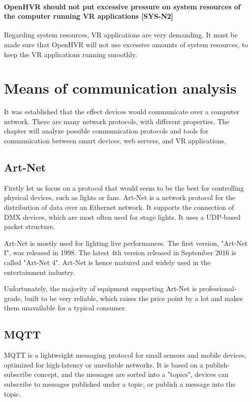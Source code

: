 \hypertarget{x-\textbf{openhvr-should-not-put-excessive-pressure-on-system-resources-of-the-computer-running-vr-applications}-[sys-n2]}{\paragraph*{\textbf{OpenHVR should not put excessive pressure on system resources of the computer running VR applications} [SYS-N2]}}
Regarding system resources, VR applications are very demanding. It must be
made sure that OpenHVR will not use excessive amounts of system resources,
to keep the VR applications running smoothly.


\hypertarget{x-means-of-communication-analysis}{\section{Means of communication analysis}}
It was established that the effect devices would communicate over a computer network.
There are many network protocols, with different properties. The chapter will
analyze possible communication protocols and tools for communication
between smart devices, web servers, and VR applications.


\hypertarget{x-art-net}{\subsection{Art-Net}}
Firstly let us focus on a protocol that would seem to be the best for controlling
physical devices, such as lights or fans. Art-Net is a network protocol for
the distribution of data over an Ethernet network. It supports the connection of DMX
devices, which are most often used for stage lights. It uses a UDP-based packet
structure. \cite{artnet}


Art-Net is mostly used for lighting live performances. The first version,
"Art-Net I", was released in 1998. The latest 4th version released
in September 2016
is called "Art-Net 4". Art-Net is hence matured and widely used in the
entertainment industry.


Unfortunately, the majority of equipment supporting Art-Net is
professional-grade, built to be very reliable, which raises the price point
by a lot and makes them unavailable for a typical consumer.


\hypertarget{x-mqtt}{\subsection{MQTT}}
MQTT is a lightweight messaging protocol for small sensors and mobile devices,
optimized for high-latency or unreliable networks.  It is
based on a publish-subscribe concept, and the messages are sorted into a "topics",
devices can subscribe to messages published under a topic, or publish
a message into the topic.\cite{mqtthp}


